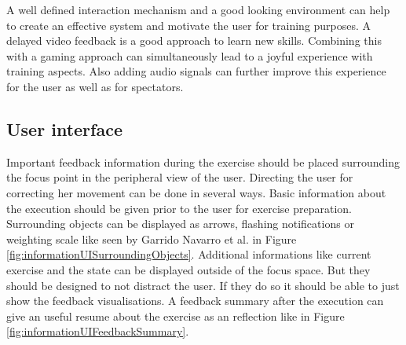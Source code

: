 A well defined interaction mechanism and a good looking environment can help to create an effective system and motivate the user for training purposes. A delayed video feedback is a good approach to learn new skills. Combining this with a gaming approach can simultaneously lead to a joyful experience with training aspects. Also adding audio signals can further improve this experience for the user as well as for spectators.

\subsection{User interface}

Important feedback information during the exercise should be placed surrounding the focus point in the peripheral view of the user. Directing the user for correcting her movement can be done in several ways. Basic information about the execution should be given prior to the user for exercise preparation. Surrounding objects can be displayed as arrows, flashing notifications or weighting scale like seen by Garrido Navarro et al. \cite{Garrido2013-zs} in Figure \ref{fig:informationUISurroundingObjects}. Additional informations like current exercise and the state can be displayed outside of the focus space. But they should be designed to not distract the user. If they do so it should be able to just show the feedback visualisations. A feedback summary after the execution can give an useful resume about the exercise as an reflection like in Figure \ref{fig:informationUIFeedbackSummary}.

